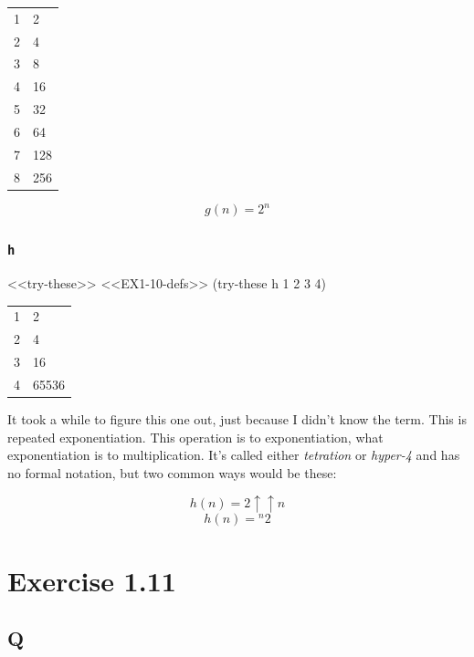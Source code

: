 \documentclass[
]{article}
\newenvironment{Shaded}{}{}
\newcommand{\DecValTok}[1]{\textcolor[rgb]{0.25,0.63,0.44}{#1}}
\newcommand{\NormalTok}[1]{#1}
\begin{document}
\begin{longtable}[]{@{}ll@{}}
\toprule
\endhead
1 & 2 \\
2 & 4 \\
3 & 8 \\
4 & 16 \\
5 & 32 \\
6 & 64 \\
7 & 128 \\
8 & 256 \\
\bottomrule
\end{longtable}

\[
g(n)=2^n
\]

\hypertarget{h}{%
\subsubsection{\texorpdfstring{\texttt{h}}{h}}\label{h}}

\begin{Shaded}
\begin{Highlighting}[numbers=left,,]
\NormalTok{\textless{}\textless{}try{-}these\textgreater{}\textgreater{}}
\NormalTok{\textless{}\textless{}EX1{-}10{-}defs\textgreater{}\textgreater{}}
\NormalTok{(try{-}these h }\DecValTok{1} \DecValTok{2} \DecValTok{3} \DecValTok{4}\NormalTok{)}
\end{Highlighting}
\end{Shaded}

\begin{longtable}[]{@{}ll@{}}
\toprule
\endhead
1 & 2 \\
2 & 4 \\
3 & 16 \\
4 & 65536 \\
\bottomrule
\end{longtable}

It took a while to figure this one out, just because I didn't know the
term. This is repeated exponentiation. This operation is to
exponentiation, what exponentiation is to multiplication. It's called
either \emph{tetration} or \emph{hyper-4} and has no formal notation,
but two common ways would be these:

\[
h(n)=2 \uparrow\uparrow n
\] \[
h(n)={}^{n}2
\]

\hypertarget{exercise-1.11}{%
\section{Exercise 1.11}\label{exercise-1.11}}

\hypertarget{q-10}{%
\subsection{Q}\label{q-10}}
\end{document}
